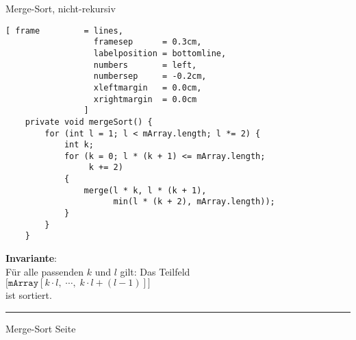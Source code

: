 \documentclass{slides}
\newcounter{mypage}
\begin{document}
\begin{slide}{}
\normalsize

\begin{center}
Merge-Sort,  nicht-rekursiv
\end{center}

\footnotesize
\begin{Verbatim}[ frame         = lines, 
                  framesep      = 0.3cm, 
                  labelposition = bottomline,
                  numbers       = left,
                  numbersep     = -0.2cm,
                  xleftmargin   = 0.0cm,
                  xrightmargin  = 0.0cm
                ]
    private void mergeSort() {
        for (int l = 1; l < mArray.length; l *= 2) {
            int k;
            for (k = 0; l * (k + 1) <= mArray.length; 
                 k += 2) 
            {
                merge(l * k, l * (k + 1), 
                      min(l * (k + 2), mArray.length));
            }
        }
    }
\end{Verbatim}

\textbf{Invariante}:
\\[0.3cm]
F\"ur alle passenden $k$ und $l$ gilt: Das Teilfeld
\\[0.3cm]
\hspace*{1.3cm}
$\biggl[\mathtt{mArray}[k\cdot l,\; \cdots,\; k\cdot l+(l-1)]\biggr]$ 
\\[0.3cm]
ist sortiert.



\vspace*{\fill}
\tiny \addtocounter{mypage}{1}
\rule{17cm}{1mm}
Merge-Sort \hspace*{\fill} Seite 
\end{slide}

\end{document}
